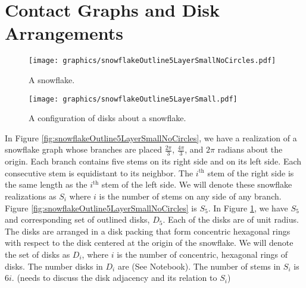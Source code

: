 \section{Contact Graphs and Disk Arrangements}

\begin{figure}[!htbp]
\centering
\begin{minipage}{0.45\textwidth}
\centering
\texttt{[image: graphics/snowflakeOutline5LayerSmallNoCircles.pdf]}
\caption{A snowflake.}\label{fig:snowflakeOutline5LayerSmallNoCircles}
\end{minipage}\hfill
\begin{minipage}{0.45\textwidth}
\centering
\texttt{[image: graphics/snowflakeOutline5LayerSmall.pdf]}
\caption{A configuration of disks about a snowflake.}\label{fig:snowflakeOutline5Layer}
\end{minipage}
\end{figure}
In Figure \ref{fig:snowflakeOutline5LayerSmallNoCircles}, we have a realization of a snowflake graph whose branches are placed $\frac{2 \pi}{3}$, $\frac{4 \pi}{3}$, and $2 \pi$ radians about the origin. Each branch contains five stems on its right side and on its left side.  Each consecutive stem is equidistant to its neighbor.  The $i^\text{th}$ stem of the right side is the same length as the $i^\text{th}$ stem of the left side.  We will denote these snowflake realizations as $S_i$ where $i$ is the number of stems on any side of any branch.  Figure \ref{fig:snowflakeOutline5LayerSmallNoCircles} is $S_5$.  In Figure \ref{fig:snowflakeOutline5Layer}, we have $S_5$ and corresponding set of outlined disks, $D_5$.  Each of the disks are of unit radius.  The disks are arranged in a disk packing that form concentric hexagonal rings with respect to the disk centered at the origin of the snowflake.  We will denote the set of disks as $D_i$, where $i$ is the number of concentric, hexagonal rings of disks.  The number disks in $D_i$ are (See Notebook).  The number of stems in $S_i$ is $6i$.  (needs to discuss the disk adjacency and its relation to $S_i$)

